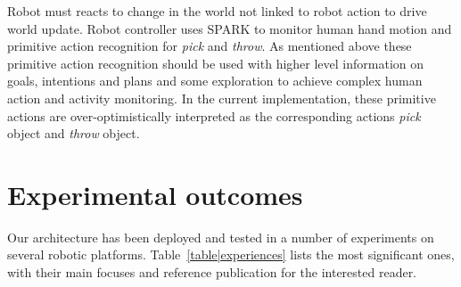 \documentclass[preprint,5p]{elsarticle}
\begin{document}
Robot must reacts to change in the world not linked to robot action to drive
world update. Robot controller uses SPARK to monitor human hand motion and
primitive action recognition for \emph{pick} and \emph{throw}. As mentioned
above these primitive action recognition should be used with higher level
information on goals, intentions and plans and some exploration to achieve
complex human action and activity monitoring.  In the current implementation,
these primitive actions are over-optimistically interpreted as the
corresponding actions \emph{pick} object and \emph{throw} object.










\section{Experimental outcomes}

Our architecture has been deployed and tested in a number of experiments on
several robotic platforms. Table~\ref{table|experiences} lists the most
significant ones, with their main focuses and reference publication for the
interested reader.
\end{document}
